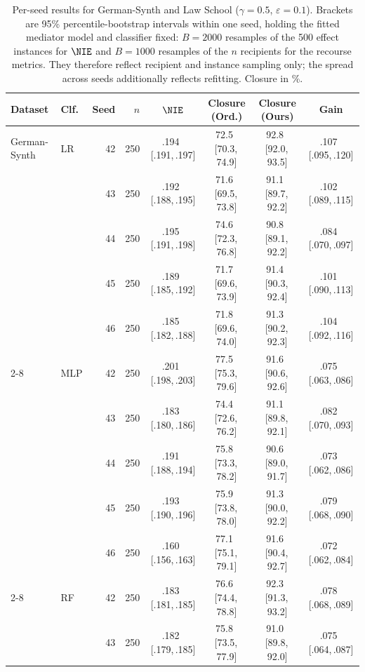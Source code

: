 \begin{table}[t]
\centering
\footnotesize
\caption{Per-seed results for German-Synth and Law School ($\gamma=0.5$,
$\varepsilon=0.1$). Brackets are 95\% percentile-bootstrap
intervals within one seed, holding the fitted mediator model and classifier
fixed: $B=2000$ resamples of the 500 effect instances for $\NIE$ and $B=1000$
resamples of the $n$ recipients for the recourse metrics. They therefore
reflect recipient and instance sampling only; the spread across seeds
additionally reflects refitting. Closure in \%.}
\label{tab:app_seed_a}
\setlength{\tabcolsep}{3.5pt}
\begin{tabular}{llrr cccc}
\hline
Dataset & Clf. & Seed & $n$ & $\NIE$ & Closure (Ord.) & Closure (Ours) &
Gain \\
\hline
German-Synth & LR & 42 & 250 & .194 \,[.191,\,.197] & 72.5 \,[70.3,\,74.9] & 92.8 \,[92.0,\,93.5] & .107 \,[.095,\,.120] \\
 &  & 43 & 250 & .192 \,[.188,\,.195] & 71.6 \,[69.5,\,73.8] & 91.1 \,[89.7,\,92.2] & .102 \,[.089,\,.115] \\
 &  & 44 & 250 & .195 \,[.191,\,.198] & 74.6 \,[72.3,\,76.8] & 90.8 \,[89.1,\,92.2] & .084 \,[.070,\,.097] \\
 &  & 45 & 250 & .189 \,[.185,\,.192] & 71.7 \,[69.6,\,73.9] & 91.4 \,[90.3,\,92.4] & .101 \,[.090,\,.113] \\
 &  & 46 & 250 & .185 \,[.182,\,.188] & 71.8 \,[69.6,\,74.0] & 91.3 \,[90.2,\,92.3] & .104 \,[.092,\,.116] \\
\cline{2-8}
 & MLP & 42 & 250 & .201 \,[.198,\,.203] & 77.5 \,[75.3,\,79.6] & 91.6 \,[90.6,\,92.6] & .075 \,[.063,\,.086] \\
 &  & 43 & 250 & .183 \,[.180,\,.186] & 74.4 \,[72.6,\,76.2] & 91.1 \,[89.8,\,92.1] & .082 \,[.070,\,.093] \\
 &  & 44 & 250 & .191 \,[.188,\,.194] & 75.8 \,[73.3,\,78.2] & 90.6 \,[89.0,\,91.7] & .073 \,[.062,\,.086] \\
 &  & 45 & 250 & .193 \,[.190,\,.196] & 75.9 \,[73.8,\,78.0] & 91.3 \,[90.0,\,92.2] & .079 \,[.068,\,.090] \\
 &  & 46 & 250 & .160 \,[.156,\,.163] & 77.1 \,[75.1,\,79.1] & 91.6 \,[90.4,\,92.7] & .072 \,[.062,\,.084] \\
\cline{2-8}
 & RF & 42 & 250 & .183 \,[.181,\,.185] & 76.6 \,[74.4,\,78.8] & 92.3 \,[91.3,\,93.2] & .078 \,[.068,\,.089] \\
 &  & 43 & 250 & .182 \,[.179,\,.185] & 75.8 \,[73.5,\,77.9] & 91.0 \,[89.8,\,92.0] & .075 \,[.064,\,.087] \\

\end{tabular}
\end{table}
